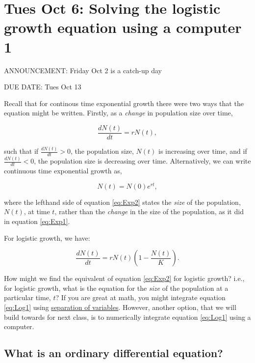 \documentclass[]{book}
\begin{document}
\chapter{Tues Oct 6: Solving the logistic growth equation using a
computer 1}\label{NumSolve1}

ANNOUNCEMENT: Friday Oct 2 is a catch-up day

DUE DATE: Tues Oct 13

Recall that for continous time exponential growth there were two ways
that the equation might be written. Firstly, as a \emph{change} in
population size over time,

\begin{equation}
\frac{dN(t)}{dt} = rN(t),
\label{eq:Exp1}
\end{equation}

such that if \(\frac{dN(t)}{dt}>0\), the population size, \(N(t)\) is
increasing over time, and if \(\frac{dN(t)}{dt}<0\), the population size
is decreasing over time. Alternatively, we can write continuous time
exponential growth as,

\begin{equation}
N(t) = N(0)e^{rt},
\label{eq:Exp2}
\end{equation}

where the lefthand side of equation \eqref{eq:Exp2} states the \emph{size}
of the population, \(N(t)\), at time \(t\), rather than the
\emph{change} in the size of the population, as it did in equation
\eqref{eq:Exp1}.

For logistic growth, we have:

\begin{equation}
\frac{dN(t)}{dt} = rN(t)\left(1 - \frac{N(t)}{K} \right).
\label{eq:Log1}
\end{equation}

How might we find the equivalent of equation \eqref{eq:Exp2} for logistic
growth? i.e., for logistic growth, what is the equation for the
\emph{size} of the population at a particular time, \(t\)? If you are
great at math, you might integrate equation \eqref{eq:Log1} using
\href{https://math.usu.edu/~powell/ysa-html/node8.html}{separation of
variables}. However, another option, that we will build towards for next
class, is to numerically integrate equation \eqref{eq:Log1} using a
computer.

\section{What is an ordinary differential
equation?}\label{what-is-an-ordinary-differential-equation}
\end{document}
